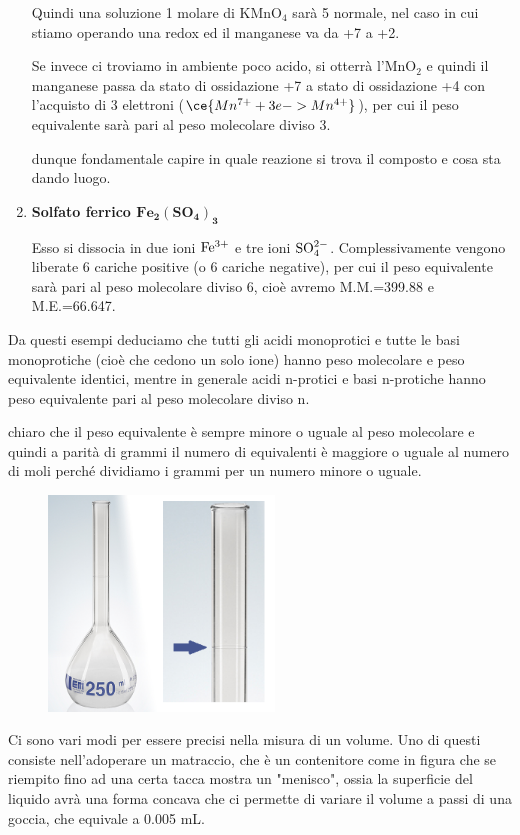 \begin{enumerate}
    Quindi una soluzione 1 molare di KMnO$_4$ sarà 5 normale, nel caso in cui stiamo operando una redox ed il manganese va da +7 a +2. 
    
    \vspace{0.2cm}Se invece ci troviamo in ambiente poco acido, si otterrà l'MnO$_2$ e quindi il manganese passa da stato di ossidazione +7 a stato di ossidazione +4 con l'acquisto di 3 elettroni ($\ce{Mn^{7+} + 3e -> Mn^{4+}}$), per cui il peso equivalente sarà pari al peso molecolare diviso 3.

    \E dunque fondamentale capire in quale reazione si trova il composto e cosa sta dando luogo.

    \item \textbf{Solfato ferrico $\mathbf{Fe_2(SO_4)_3}$}

    Esso si dissocia in due ioni $\rm Fe^{3+}$ e tre ioni $\rm SO_4^{2-}$. Complessivamente vengono liberate 6 cariche positive (o 6 cariche negative), per cui il peso equivalente sarà pari al peso molecolare diviso 6, cioè avremo M.M.=399.88 e M.E.=66.647.
\end{enumerate}

Da questi esempi deduciamo che tutti gli acidi monoprotici e tutte le basi monoprotiche (cioè che cedono un solo ione) hanno peso molecolare e peso equivalente identici, mentre in generale acidi n-protici e basi n-protiche hanno peso equivalente pari al peso molecolare diviso n.

\E chiaro che il peso equivalente è sempre minore o uguale al peso molecolare e quindi a parità di grammi il numero di equivalenti è maggiore o uguale al numero di moli perché dividiamo i grammi per un numero minore o uguale.

\hspace{1cm}\begin{minipage}{0.42\textwidth}
    \begin{figure}[H]
        \includegraphics[width=6cm]{immagini/matraccio.png}
    \end{figure}
\end{minipage}
\begin{minipage}{0.5\textwidth}
    Ci sono vari modi per essere precisi nella misura di un volume. Uno di questi consiste nell'adoperare un matraccio, che è un contenitore come in figura che se riempito fino ad una certa tacca mostra un "menisco", ossia la superficie del liquido avrà una forma concava che ci permette di variare il volume a passi di una goccia, che equivale a 0.005 mL.
\end{minipage}

